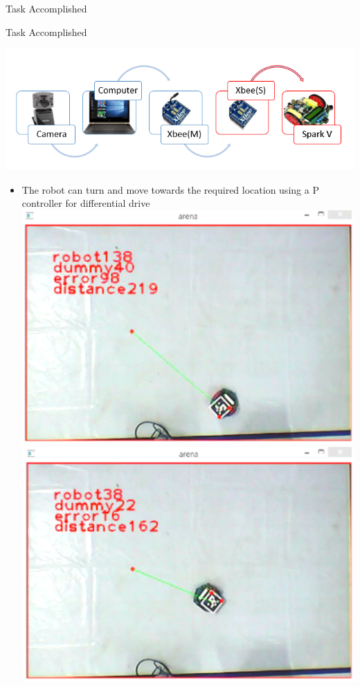 \documentclass[11pt, a4paper]{beamer}
\begin{document}
\begin{frame}{Task Accomplished}
\begin{itemize}
\begin{center}
			\end{center}
\end{itemize}
\end{frame}

\begin{frame}{Task Accomplished}

\includegraphics[scale =.4]{images/flow.png}
\begin{itemize}
		\item The robot can turn and move towards the required location using a P controller for differential drive\\	\includegraphics[scale =.35]{images/snip0.png}\includegraphics[scale =.35]{images/snip1.png}\\
	\end{itemize}
\end{frame}
\end{document}

